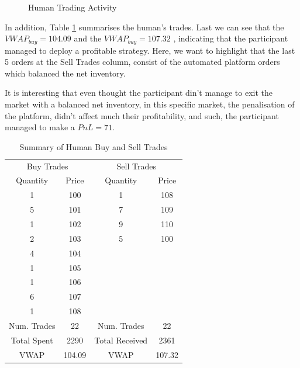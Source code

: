 \begin{figure}[!htbp]
    \caption{Human Trading Activity}
    \label{fig:human_trading_activity}
\end{figure}

In addition, Table \ref{tab:empirical_human_trades} summarises the human's trades. Last we can see that the $VWAP_{buy} = 104.09$ and the $VWAP_{buy} = 107.32$ , indicating that the participant managed to deploy a profitable strategy. Here, we want to highlight that the last 5 orders at the Sell Trades column, consist of the automated platform orders which balanced the net inventory. 

It is interesting that even thought the participant din't manage to exit the market with a balanced net inventory, in this specific market, the penalisation of the platform, didn't affect much their profitability, and such, the participant managed to make a $PnL = 71$.
\begin{table}[h]
\centering
\caption{Summary of Human Buy and Sell Trades}
\label{tab:empirical_human_trades}
\begin{tabular}{cc|cc}
\toprule
\multicolumn{2}{c|}{Buy Trades} & \multicolumn{2}{c}{Sell Trades}\\
Quantity & Price  & Quantity & Price  \\
\hline
1 & 100 & 1 & 108\\
5 & 101 & 7 & 109\\
1 & 102  & 9 & 110\\
2 & 103  & 5 & 100\\
4 & 104 \\
1 & 105 \\
1 & 106 \\
6 & 107 \\
1 & 108 \\
\hline
Num. Trades & 22 & Num. Trades & 22  \\
Total Spent & 2290 & Total Received & 2361\\
VWAP & 104.09 & VWAP & 107.32  \\
\bottomrule
\end{tabular}
\end{table}

